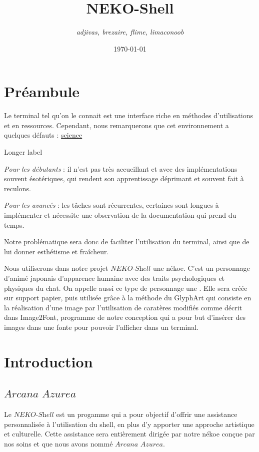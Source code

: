 \documentclass[titlepage]{article}
\title{\Huge{NEKO-Shell}}
\author{\textit{\Large{adjivas, brezaire, flime, limaconoob}}}
\date{\today}
\newcommand{\name}{\textit{Arcana Azurea}}
\newcommand{\program}{\textit{NEKO-Shell}}
\begin{document}
\maketitle

\newpage
\tableofcontents

\newpage
\section{Préambule}


Le terminal tel qu'on le connait est une interface riche en méthodes d'utilisations et en ressources. Cependant, nous remarquerons que cet environnement a quelques défauts :
\underline{science}

\begin{labeling}{Longer label\quad}
	\item[\textit{Pour les débutants}]: il n'est pas très accueillant et avec des implémentations souvent ésotériques, qui rendent son apprentissage déprimant et souvent fait à reculons. 
	\item[\textit{Pour les avancés}]: les tâches sont récurrentes, certaines sont longues à implémenter et nécessite une observation de la documentation qui prend du temps.
\end{labeling}

Notre problématique sera donc de faciliter l'utilisation du terminal, ainsi que de lui donner esthétisme et fraîcheur.


Nous utiliserons dans notre projet $\program$ une nékoe. C'est un personnage d'animé japonais d'apparence humaine avec des traits psychologiques et physiques du chat. On appelle aussi ce type de personnage une
 \textendash.
Elle sera créée sur support papier, puis utilisée grâce à la méthode du GlyphArt qui consiste en la réalisation d'une image par l'utilisation de caratères modifiés comme décrit dans Image2Font, programme de notre conception qui a pour but d'insérer des images dans une fonte pour pouvoir l'afficher dans un terminal.

\newpage
\section{Introduction}

\subsection{$\name$}
Le $\program$ est un progamme qui a pour objectif d'offrir une assistance personnalisée à l'utilisation du shell, en plus d'y apporter une approche artistique et culturelle. Cette assistance sera entièrement dirigée par notre nékoe conçue par nos soins et que nous avons nommé $\name$.
\end{document}
